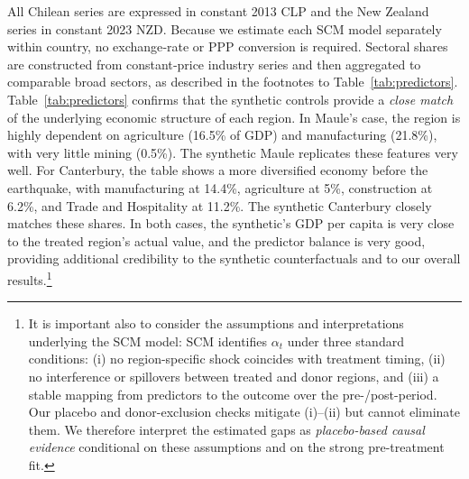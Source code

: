 \documentclass[12pt]{article}
\begin{document}
All Chilean series are expressed in constant 2013 CLP and the New Zealand series in constant 2023 NZD. Because we estimate each SCM model separately within country, no exchange‑rate or PPP conversion is required. Sectoral shares are constructed from constant‑price industry series and then aggregated to comparable broad sectors, as described in the footnotes to Table~\ref{tab:predictors}. Table \ref{tab:predictors} confirms that the synthetic controls provide a \textit{close match} of the underlying economic structure of each region. In Maule’s case, the region is highly dependent on agriculture (16.5\% of GDP) and manufacturing (21.8\%), with very little mining (0.5\%). The synthetic Maule replicates these features very well. For Canterbury, the table shows a more diversified economy before the earthquake, with manufacturing at 14.4\%, agriculture at 5\%, construction at 6.2\%, and Trade and Hospitality at 11.2\%. The synthetic Canterbury closely matches these shares. In both cases, the synthetic's GDP per capita is very close to the treated region's actual value, and the predictor balance is very good, providing additional credibility to the synthetic counterfactuals and to our overall results.\footnote{It is important also to consider the assumptions and interpretations underlying the SCM model: SCM identifies $\alpha_t$ under three standard conditions: (i) no region-specific shock coincides with treatment timing, (ii) no interference or spillovers between treated and donor regions, and (iii) a stable mapping from predictors to the outcome over the pre-/post-period. Our placebo and donor-exclusion checks mitigate (i)–(ii) but cannot eliminate them. We therefore interpret the estimated gaps as \emph{placebo-based causal evidence} conditional on these assumptions and on the strong pre-treatment fit.}
\end{document}
